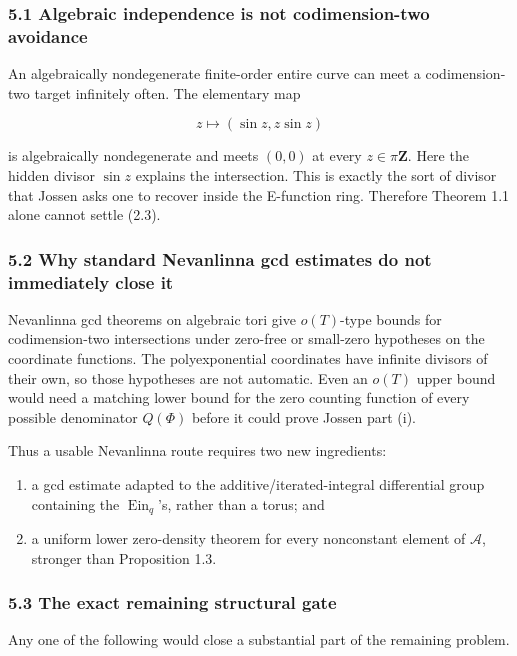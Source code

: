 \documentclass[11pt]{article}
\theoremstyle{keio}
\theoremstyle{definition}
\theoremstyle{remark}
\providecommand{\tightlist}{\setlength{\itemsep}{0pt}\setlength{\parskip}{0pt}}
\begin{document}
\subsubsection{5.1 Algebraic independence is not codimension-two avoidance}

An algebraically nondegenerate finite-order entire curve can meet a
codimension-two target infinitely often. The elementary map

\[
  z\longmapsto(\sin z,z\sin z)
\]

is algebraically nondegenerate and meets \((0,0)\) at every \(z\in\pi\mathbf Z\).
Here the hidden divisor \(\sin z\) explains the intersection. This is exactly
the sort of divisor that Jossen asks one to recover inside the E-function
ring. Therefore Theorem 1.1 alone cannot settle (2.3).

\subsubsection{5.2 Why standard Nevanlinna gcd estimates do not immediately close it}

Nevanlinna gcd theorems on algebraic tori give
\(o(T)\)-type bounds for codimension-two intersections under zero-free or
small-zero hypotheses on the coordinate functions. The polyexponential
coordinates have infinite divisors of their own, so those hypotheses are not
automatic. Even an \(o(T)\) upper bound would need a matching lower bound for
the zero counting function of every possible denominator \(Q(\Phi)\) before
it could prove Jossen part (i).

Thus a usable Nevanlinna route requires two new ingredients:

\begin{enumerate}
\def\labelenumi{\arabic{enumi}.}
\tightlist
\item
  a gcd estimate adapted to the additive/iterated-integral differential
  group containing the \(\operatorname{Ein}_q\)'s, rather than a torus; and
\item
  a uniform lower zero-density theorem for every nonconstant element of
  \(\mathscr A\), stronger than Proposition 1.3.
\end{enumerate}

\subsubsection{5.3 The exact remaining structural gate}

Any one of the following would close a substantial part of the remaining
problem.
\end{document}
